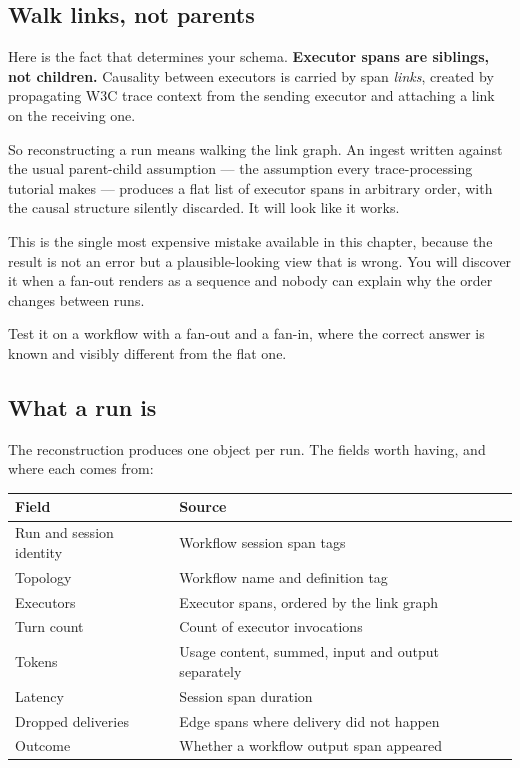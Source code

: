 \subsection{Walk links, not parents}

Here is the fact that determines your schema. \textbf{Executor spans are
siblings, not children.} Causality between executors is carried by span
\emph{links}, created by propagating W3C trace context from the sending executor
and attaching a link on the receiving one.

So reconstructing a run means walking the link graph. An ingest written against
the usual parent-child assumption --- the assumption every trace-processing
tutorial makes --- produces a flat list of executor spans in arbitrary order,
with the causal structure silently discarded. It will look like it works.

\begin{warning}
This is the single most expensive mistake available in this chapter, because the
result is not an error but a plausible-looking view that is wrong. You will
discover it when a fan-out renders as a sequence and nobody can explain why the
order changes between runs.

Test it on a workflow with a fan-out and a fan-in, where the correct answer is
known and visibly different from the flat one.
\end{warning}

\subsection{What a run is}

The reconstruction produces one object per run. The fields worth having, and
where each comes from:

\begin{center}
\small
\begin{tabularx}{\linewidth}{@{}lX@{}}
\toprule
\textbf{Field} & \textbf{Source} \\
\midrule
Run and session identity & Workflow session span tags \\[4pt]
Topology & Workflow name and definition tag \\[4pt]
Executors & Executor spans, ordered by the link graph \\[4pt]
Turn count & Count of executor invocations \\[4pt]
Tokens & Usage content, summed, input and output separately \\[4pt]
Latency & Session span duration \\[4pt]
Dropped deliveries & Edge spans where delivery did not happen \\[4pt]
Outcome & Whether a workflow output span appeared \\
\bottomrule
\end{tabularx}
\end{center}

